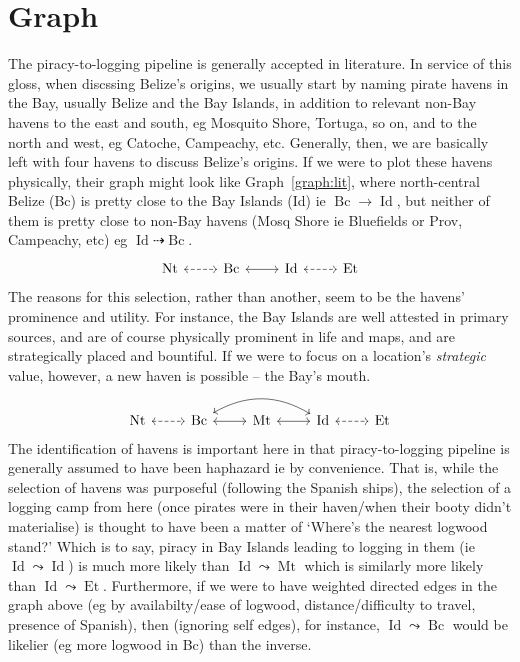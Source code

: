 \documentclass{amsart}
\DeclareMathOperator{\id}{Id}%
\DeclareMathOperator{\mt}{Mt}%
\DeclareMathOperator{\bc}{Bc}%
\DeclareMathOperator{\et}{Et}%
\DeclareMathOperator{\nt}{Nt}%
\theoremstyle{definition}%
\theoremstyle{definition}%
\theoremstyle{remark}%
\begin{document}
\section{Graph}
\label{s:graph}
The piracy-to-logging pipeline is generally accepted in literature. In service of this gloss, when discssing Belize's origins, we usually start by naming pirate havens in the Bay, usually Belize and the Bay Islands, in addition to relevant non-Bay havens to the east and south, eg Mosquito Shore, Tortuga, so on, and to the north and west, eg Catoche, Campeachy, etc. Generally, then, we are basically left with four havens to discuss Belize's origins. If we were to plot these havens physically, their graph might look like Graph~\ref{graph:lit}, where north-central Belize (Bc) is pretty close to the Bay Islands (Id) ie \(\bc\to\id\), but neither of them is pretty close to non-Bay havens (Mosq Shore ie Bluefields or Prov, Campeachy, etc) eg \(\id\dashrightarrow\bc\).
%
\begin{equation}
\label{graph:lit}%
\begin{tikzcd}[arrows=leftrightarrow]
\nt \rar[dashed] &\bc \rar &\id \rar[dashed] &\et
\end{tikzcd}
\end{equation}
%
The reasons for this selection, rather than another, seem to be the havens' prominence and utility. For instance, the Bay Islands are well attested in primary sources, and are of course physically prominent in life and maps, and are strategically placed and bountiful. If we were to focus on a location's \emph{strategic} value, however, a new haven is possible -- the Bay's mouth.
%
\begin{equation}
\label{graph:prop}%
\begin{tikzcd}[arrows=leftrightarrow]
\nt \rar[dashed] &\bc \rar \ar[rr,bend left] &\mt \rar &\id \rar[dashed] &\et
\end{tikzcd}
\end{equation}
%
The identification of havens is important here in that piracy-to-logging pipeline is generally assumed to have been haphazard ie by convenience. That is, while the selection of havens was purposeful (following the Spanish ships), the selection of a logging camp from here (once pirates were in their haven/when their booty didn't materialise) is thought to have been a matter of `Where's the nearest logwood stand?' %
Which is to say, piracy in Bay Islands leading to logging in them (ie \(\id\leadsto\id\)) is much more likely than \(\id\leadsto\mt\) which is similarly more likely than 
\(\id\leadsto\et\). Furthermore, if we were to have weighted directed edges in the graph above (eg by availabilty/ease of logwood, distance/difficulty to travel, presence of Spanish), then (ignoring self edges), for instance, \(\id\leadsto\bc\) would be likelier (eg more logwood in Bc) than the inverse.
\end{document}
